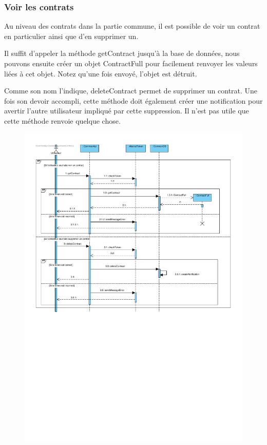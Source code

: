 \newpage

\subsubsection{Voir les contrats}

\begin{flushleft}
Au niveau des contrats dans la partie commune, il est possible de voir un contrat en particulier ainsi que d'en supprimer un.
\end{flushleft}

\begin{flushleft}
Il suffit d'appeler la méthode getContract jusqu'à la base de données, nous pouvons ensuite créer un objet ContractFull pour facilement renvoyer les valeurs liées à cet objet. Notez qu'une fois envoyé, l'objet est détruit.
\end{flushleft}

\begin{flushleft}
Comme son nom l'indique, deleteContract permet de supprimer un contrat. Une fois son devoir accompli, cette méthode doit également créer une notification pour avertir l'autre utilisateur impliqué par cette suppression. Il n'est pas utile que cette méthode renvoie quelque chose.
\end{flushleft}

\begin{figure}[h]
\centering
\includegraphics[height = 1\textwidth]{Base/sequence/img/common/Voir les contrats.pdf}
\end{figure}

